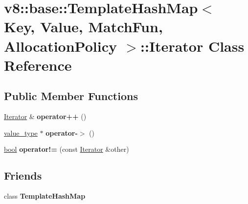 \hypertarget{classv8_1_1base_1_1TemplateHashMap_1_1Iterator}{}\section{v8\+:\+:base\+:\+:Template\+Hash\+Map$<$ Key, Value, Match\+Fun, Allocation\+Policy $>$\+:\+:Iterator Class Reference}
\label{classv8_1_1base_1_1TemplateHashMap_1_1Iterator}
\subsection*{Public Member Functions}
\begin{DoxyCompactItemize}
\item 
\mbox{\label{classv8_1_1base_1_1TemplateHashMap_1_1Iterator_a6576b99b8847bd255dae20dac7dd2b1f}} 
\mbox{\hyperlink{classv8_1_1base_1_1TemplateHashMap_1_1Iterator}{Iterator}} \& {\bfseries operator++} ()
\item 
\mbox{\label{classv8_1_1base_1_1TemplateHashMap_1_1Iterator_a1d204e2477cbd36908adf6c798c823fa}} 
\mbox{\hyperlink{structv8_1_1base_1_1TemplateHashMap_1_1value__type}{value\+\_\+type}} $\ast$ {\bfseries operator-\/$>$} ()
\item 
\mbox{\label{classv8_1_1base_1_1TemplateHashMap_1_1Iterator_a0b189ba9f274fdf6be6e287fb1a9b454}} 
\mbox{\hyperlink{classbool}{bool}} {\bfseries operator!=} (const \mbox{\hyperlink{classv8_1_1base_1_1TemplateHashMap_1_1Iterator}{Iterator}} \&other)
\end{DoxyCompactItemize}
\subsection*{Friends}
\begin{DoxyCompactItemize}
\item 
\mbox{\label{classv8_1_1base_1_1TemplateHashMap_1_1Iterator_a832edaa667b9d84ea7de776a289ff79e}} 
class {\bfseries Template\+Hash\+Map}
\end{DoxyCompactItemize}


